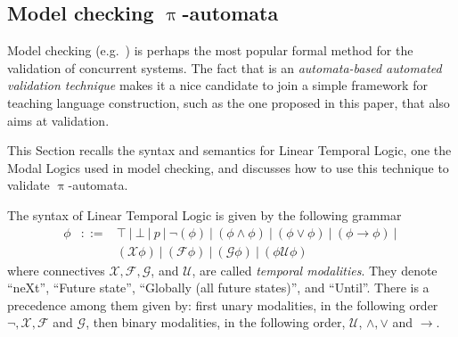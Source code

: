 \documentclass{llncs}%
\begin{document}
\subsection{Model checking $\uppi$-automata}\label{sec:mc-gia}

Model checking (e.g.~\cite{Clarke:2000:MC:332656}) is perhaps the most popular formal method for the validation of concurrent systems. The fact that is an \emph{automata-based automated validation technique} makes it a nice candidate to join a simple framework for teaching language construction, such as the one proposed in this paper, that also aims at validation.


This Section recalls the syntax and semantics for Linear Temporal Logic, one the Modal Logics used in model checking, and discusses how to use this technique to validate $\uppi$-automata.

The syntax of Linear Temporal Logic is given by the following grammar 
$$\begin{array}{rcl}
\phi & ::= & \top ~|~ \bot ~|~ p ~|~ \neg(\phi) ~|~ (\phi \land \phi) ~|~ (\phi \lor \phi) ~|~ (\phi \to \phi) ~|~ \\
       &     & (\mathcal{X} \phi) ~|~ (\mathcal{F} \phi) ~|~ (\mathcal{G} \phi) ~|~ (\phi \mathcal{U} \phi) 
\end{array}$$
where connectives $\mathcal{X}, \mathcal{F}, \mathcal{G}$, and $\mathcal{U}$,  
are called \emph{temporal modalities}. They denote ``neXt'', ``Future state'', ``Globally (all future states)'', and ``Until''. There is a precedence among them given by: first unary modalities, in the following order $\neg, \mathcal{X}, \mathcal{F}$ and $\mathcal{G}$, then binary modalities, in the following order, $\mathcal{U}$, $\land, \lor$ and $\to$. %
\end{document}
